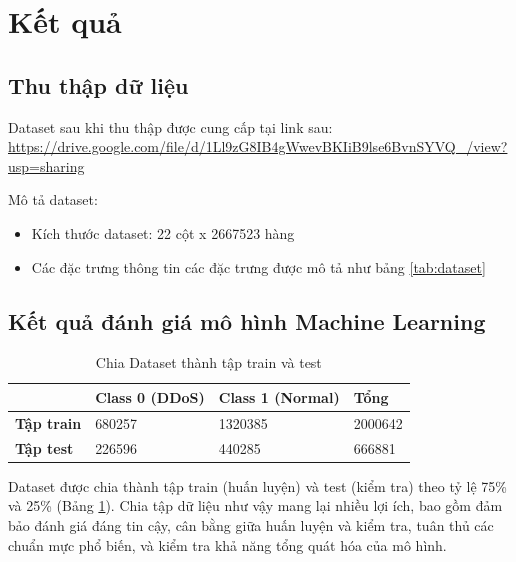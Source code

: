 \documentclass[a4paper]{article}
\begin{document}
\section{Kết quả}
\subsection{Thu thập dữ liệu}
Dataset sau khi thu thập được cung cấp tại link sau: \\ \url{https://drive.google.com/file/d/1Ll9zG8IB4gWwevBKIiB9lse6BvnSYVQ_/view?usp=sharing}

Mô tả dataset: 
\begin{itemize}
    \item Kích thước dataset: 22 cột x 2667523 hàng
    \item Các đặc trưng thông tin các đặc trưng được mô tả như bảng \ref{tab:dataset}
\end{itemize}

\subsection{Kết quả đánh giá mô hình Machine Learning}
\begin{table}[H]
    \centering
    \caption{Chia Dataset thành tập train và test}
    \label{tab:chiadulieu}
    \addvspace{0.3cm}
    \begin{tabular}{|p{2cm}|p{3cm}|p{3.5cm}|p{3cm}|}
    \hline
         & \textbf{Class 0 (DDoS)} & \textbf{Class 1 (Normal)} & \textbf{Tổng }\\ \hline
    \textbf{Tập train} & 680257 & 1320385 & 2000642 \\ \hline
    \textbf{Tập test} & 226596 & 440285 & 666881 \\ \hline
    \end{tabular}
\end{table}
Dataset được chia thành tập train (huấn luyện) và test (kiểm tra) theo tỷ lệ 75\% và 25\% (Bảng \ref{tab:chiadulieu}). Chia tập dữ liệu như vậy mang lại nhiều lợi ích, bao gồm đảm bảo đánh giá đáng tin cậy, cân bằng giữa huấn luyện và kiểm tra, tuân thủ các chuẩn mực phổ biến, và kiểm tra khả năng tổng quát hóa của mô hình. 
\end{document}
